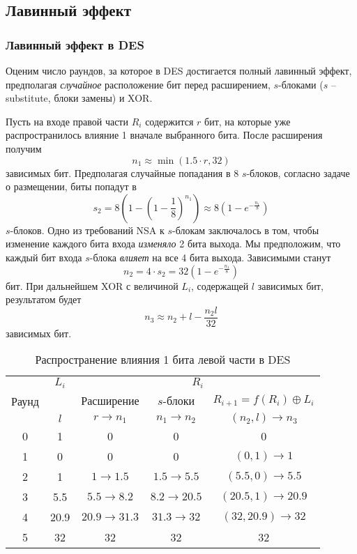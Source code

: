 \subsection{Лавинный эффект}

\subsubsection{Лавинный эффект в DES}

Оценим число раундов, за которое в DES достигается полный лавинный эффект, предполагая \emph{случайное} расположение бит перед расширением, $s$-блоками ($s$ -- substitute, блоки замены) и XOR.

Пусть на входе правой части $R_i$ содержится $r$ бит, на которые уже распространилось влияние 1 вначале выбранного бита. После расширения получим
    \[ n_1 \approx \min(1.5 \cdot r, 32) \]
зависимых бит. Предполагая случайные попадания в 8 $s$-блоков, согласно задаче о размещении, биты попадут в
    \[ s_2 = 8 \left( 1 - \left( 1 - \frac{1}{8} \right)^{n_1} \right) \approx 8 \left( 1 - e^{-\frac{n_1}{8}} \right) \]
$s$-блоков. Одно из требований NSA к $s$-блокам заключалось в том, чтобы изменение каждого бита входа \emph{изменяло} 2 бита выхода. Мы предположим, что каждый бит входа $s$-блока \emph{влияет} на все 4 бита выхода. Зависимыми станут
    \[ n_2 = 4 \cdot s_2 = 32 \left( 1 - e^{-\frac{n_1}{8}} \right) \]
бит. При дальнейшем XOR с величиной $L_i$, содержащей $l$ зависимых бит, результатом будет
    \[ n_3 \approx n_2 + l  - \frac{n_2 l}{32} \]
зависимых бит.

\begin{table}[h!]
    \centering
    \caption{Распространение влияния 1 бита левой части в DES\label{tab-DES-avalance-effect}}
    \begin{tabular}{||c||c||c|c|c||}
        \hline
        \multirow{3}{*}{Раунд} & $L_i$ & \multicolumn{3}{|c||}{$R_i$} \\
        \cline{2-5}
        & & Расширение & $s$-блоки & $R_{i+1} = f(R_i) \oplus L_i$ \\
        & $l$ & $r \rightarrow n_1$ & $n_1 \rightarrow n_2$ & $(n_2, l) \rightarrow n_3$ \\
        \hline \hline
        0 & 1 & 0 & 0 & 0 \\
        1 & 0 & 0 & 0 & $(0,1) \rightarrow 1$ \\
        2 & 1 & $1 \rightarrow 1.5$ & $1.5 \rightarrow 5.5$ & $(5.5, 0) \rightarrow 5.5$ \\
        3 & 5.5 & $5.5 \rightarrow 8.2$ & $8.2 \rightarrow 20.5$ & $(20.5, 1) \rightarrow 20.9$ \\
        4 & 20.9 & $20.9 \rightarrow 31.3$ & $31.3 \rightarrow 32$ & $(32, 20.9) \rightarrow 32$ \\
        5 & 32 & 32 & 32 & 32 \\
      \hline
    \end{tabular}
\end{table}

